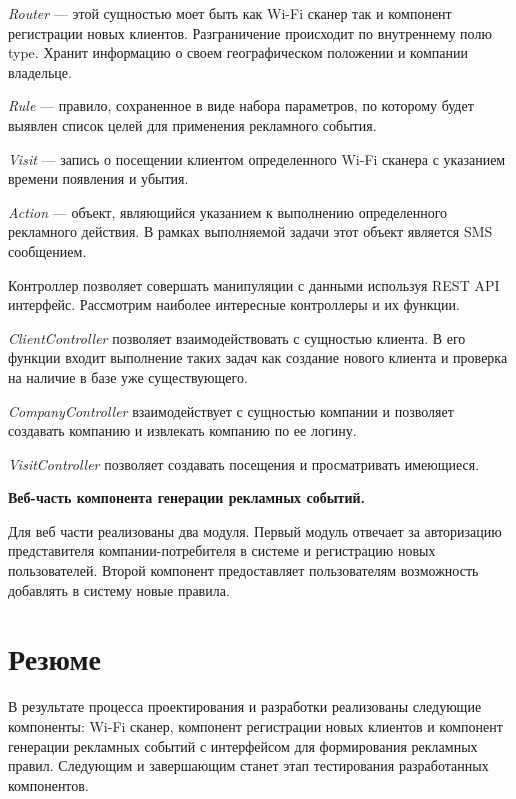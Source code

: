 \textit{Router} --- этой сущностью моет быть как Wi-Fi сканер так и компонент регистрации новых клиентов. Разграничение происходит по внутреннему полю type. Хранит информацию о своем географическом положении и компании владельце.

\textit{Rule} --- правило, сохраненное в виде набора параметров, по которому будет выявлен список целей для применения рекламного события. 

\textit{Visit} --- запись о посещении клиентом определенного Wi-Fi сканера с указанием времени появления и убытия.

\textit{Action} --- объект, являющийся указанием к выполнению определенного рекламного действия. В рамках выполняемой задачи этот объект является SMS сообщением. 

Контроллер позволяет совершать манипуляции с данными используя REST API интерфейс. Рассмотрим наиболее интересные контроллеры и их функции.

 \textit{ClientController} позволяет взаимодействовать с сущностью клиента. В его функции входит выполнение таких задач как создание нового клиента и проверка на наличие в базе уже существующего.

 \textit{CompanyController} взаимодействует с сущностью компании и позволяет создавать компанию и извлекать компанию по ее логину.

 \textit{VisitController} позволяет создавать посещения и просматривать имеющиеся. 

\textbf{Веб-часть компонента генерации рекламных событий.}

Для веб части реализованы два модуля. Первый модуль отвечает за авторизацию представителя компании-потребителя в системе и регистрацию новых пользователей. Второй компонент предоставляет пользователям возможность добавлять в систему новые правила.

\section{Резюме}

В результате процесса проектирования и разработки реализованы следующие компоненты: Wi-Fi сканер, компонент регистрации новых клиентов и компонент генерации рекламных событий с интерфейсом для формирования рекламных правил. Следующим и завершающим станет этап тестирования разработанных компонентов.